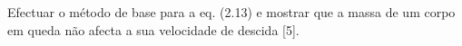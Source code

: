 Efectuar o método de base para a eq. (2.13) e mostrar que a massa de um corpo em queda não afecta a sua velocidade de descida [5].
